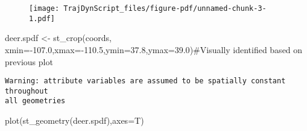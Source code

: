 \documentclass[
  letterpaper,
]{book}
\newenvironment{Shaded}{\begin{snugshade}}{\end{snugshade}}
\newcommand{\AttributeTok}[1]{\textcolor[rgb]{0.40,0.45,0.13}{#1}}
\newcommand{\CommentTok}[1]{\textcolor[rgb]{0.37,0.37,0.37}{#1}}
\newcommand{\DecValTok}[1]{\textcolor[rgb]{0.68,0.00,0.00}{#1}}
\newcommand{\FloatTok}[1]{\textcolor[rgb]{0.68,0.00,0.00}{#1}}
\newcommand{\FunctionTok}[1]{\textcolor[rgb]{0.28,0.35,0.67}{#1}}
\newcommand{\NormalTok}[1]{\textcolor[rgb]{0.00,0.23,0.31}{#1}}
\newcommand{\OtherTok}[1]{\textcolor[rgb]{0.00,0.23,0.31}{#1}}
\newcommand{\SpecialCharTok}[1]{\textcolor[rgb]{0.37,0.37,0.37}{#1}}
\newcommand{\StringTok}[1]{\textcolor[rgb]{0.13,0.47,0.30}{#1}}
\begin{document}
\begin{Shaded}
\end{Shaded}

\begin{figure}[H]

{\centering \texttt{[image: TrajDynScript\_files/figure-pdf/unnamed-chunk-3-1.pdf]}

}

\end{figure}

\begin{Shaded}
\begin{Highlighting}[]
\NormalTok{deer.spdf }\OtherTok{\textless{}{-}} \FunctionTok{st\_crop}\NormalTok{(coords, }\AttributeTok{xmin=}\SpecialCharTok{{-}}\FloatTok{107.0}\NormalTok{,}\AttributeTok{xmax=}\SpecialCharTok{{-}}\FloatTok{110.5}\NormalTok{,}\AttributeTok{ymin=}\FloatTok{37.8}\NormalTok{,}\AttributeTok{ymax=}\FloatTok{39.0}\NormalTok{)}\CommentTok{\#Visually identified based on previous plot}
\end{Highlighting}
\end{Shaded}

\begin{verbatim}
Warning: attribute variables are assumed to be spatially constant throughout
all geometries
\end{verbatim}

\begin{Shaded}
\begin{Highlighting}[]
\FunctionTok{plot}\NormalTok{(}\FunctionTok{st\_geometry}\NormalTok{(deer.spdf),}\AttributeTok{axes=}\NormalTok{T)}
\end{Highlighting}
\end{Shaded}
\end{document}
